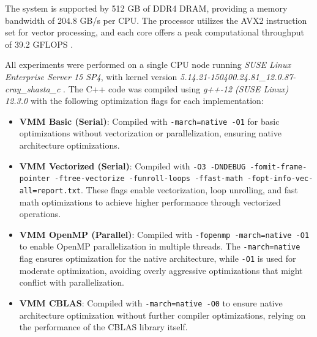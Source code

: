 The system is supported by 512 GB of DDR4 DRAM, providing a memory bandwidth of 204.8 GB/s per CPU. The processor utilizes the AVX2 instruction set for vector processing, and each core offers a peak computational throughput of 39.2 GFLOPS \cite{nersc_perlmutter_architecture}.


All experiments were performed on a single CPU node running \textit{SUSE Linux Enterprise Server 15 SP4}, with kernel version \textit{5.14.21-150400.24.81\_12.0.87-cray\_shasta\_c} \cite{usami2024hostnamectl}. The C++ code was compiled using \textit{g++-12 (SUSE Linux) 12.3.0} with the following optimization flags for each implementation:

\begin{itemize}
    \raggedright    
    \item \textbf{VMM Basic (Serial)}: Compiled with \texttt{-march=native -O1} for basic optimizations without vectorization or parallelization, ensuring native architecture optimizations.

    \item \textbf{VMM Vectorized (Serial)}: Compiled with \texttt{-O3 -DNDEBUG -fomit-frame-pointer -ftree-vectorize -funroll-loops -ffast-math -fopt-info-vec-all=report.txt}. These flags enable vectorization, loop unrolling, and fast math optimizations to achieve higher performance through vectorized operations.
    
    \item \textbf{VMM OpenMP (Parallel)}: Compiled with \texttt{-fopenmp -march=native -O1} to enable OpenMP parallelization in multiple threads. The \texttt{-march=native} flag ensures optimization for the native architecture, while \texttt{-O1} is used for moderate optimization, avoiding overly aggressive optimizations that might conflict with parallelization.
    
    \item \textbf{VMM CBLAS}: Compiled with \texttt{-march=native -O0} to ensure native architecture optimization without further compiler optimizations, relying on the performance of the CBLAS library itself.
\end{itemize}

